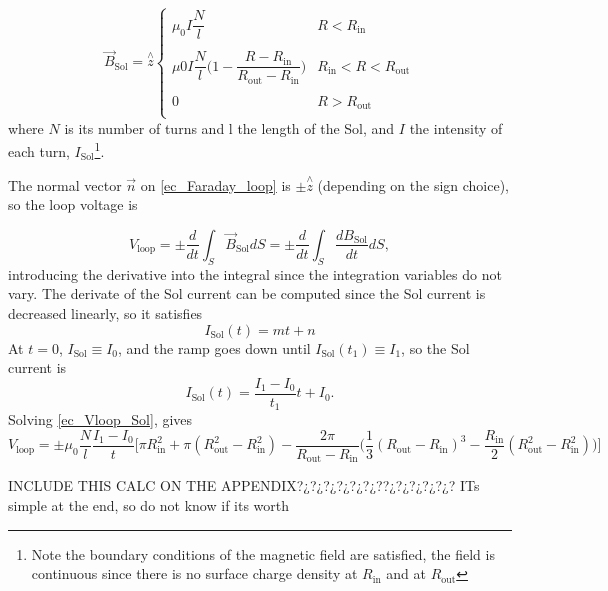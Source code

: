 \documentclass[a4paper,12pt,oneside]{book}
\begin{document}
\begin{equation}
\vec{B}_\text{Sol}= \stackrel{\wedge}{z}
\left\{
	\begin{array}{cc}
	\mu_0 I \dfrac{N}{l} & R < R_\text{in} \\
	\\
	 \mu0 I \dfrac{N}{l} \Big(1- \dfrac{R-R_\text{in}}{R_\text{out}-R_\text{in}} \Big)  & R_\text{in}<R<R_\text{out} \\ 
	 \\
	0 & R> R_\text{out} \\
	\end{array}
\right.
\end{equation}
where $N$ is its number of turns and l the length of the Sol, and $I$ the intensity of each turn, $I_\text{Sol}$\footnote{Note the boundary conditions of the magnetic field are satisfied, the field is continuous since there is no surface charge density at $R_\text{in}$ and at $R_\text{out}$}.

The normal vector $\vec{n}$ on \eqref{ec_Faraday_loop} is $\pm \stackrel{\wedge}{z}$ (depending on the sign choice), so the loop voltage is

\begin{equation}\label{ec_Vloop_Sol}
V_\text{loop} = \pm \dfrac{d}{dt} \int_S \vec{B}_\text{Sol} dS= \pm \dfrac{d}{dt} \int_S \dfrac{d B_\text{Sol}}{dt} dS,
\end{equation}
introducing the derivative into the integral since the integration variables do not vary. The derivate of the Sol current can be computed since the Sol current is decreased linearly, so it satisfies
%
\begin{equation}
I_\text{Sol}(t)=m t +n
\end{equation}
At $t=0$, $I_\text{Sol} \equiv I_0$, and the ramp goes down until $I_\text{Sol}(t_1) \equiv  I_1$, so the Sol current is
%
\begin{equation}
I_\text{Sol}(t)=\dfrac{I_1-I_0}{t_1} t +I_0.
\end{equation}
Solving \eqref{ec_Vloop_Sol}, gives
%
\begin{equation}
V_\text{loop}= \pm \mu_0 \dfrac{N}{l} \dfrac{I_1-I_0}{t} \Big[ \pi R_\text{in}^2  + \pi (R_\text{out}^2-R_\text{in}^2) - \dfrac{2 \pi}{R_\text{out}-R_\text{in}} \Big( \dfrac{1}{3} (R_\text{out}-R_\text{in})^3 - \dfrac{R_\text{in}}{2} (R_\text{out}^2-R_\text{in}^2) \Big) \Big]
\end{equation}

INCLUDE THIS CALC ON THE APPENDIX?¿?¿?¿?¿?¿?¿??¿?¿?¿?¿?¿? ITs simple at the end, so do not know if its worth
\end{document}

